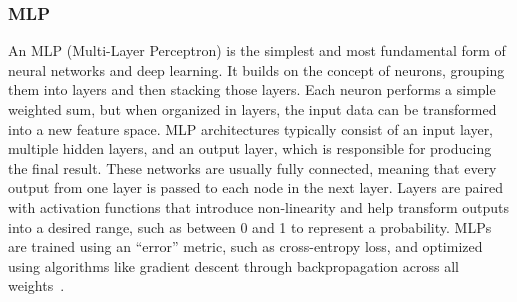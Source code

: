 \subsubsection{MLP}
An MLP (Multi-Layer Perceptron) is the simplest and most fundamental form of neural networks and deep learning. It builds on the concept of neurons, grouping them into layers and then stacking those layers. Each neuron performs a simple weighted sum, but when organized in layers, the input data can be transformed into a new feature space. MLP architectures typically consist of an input layer, multiple hidden layers, and an output layer, which is responsible for producing the final result. These networks are usually fully connected, meaning that every output from one layer is passed to each node in the next layer. Layers are paired with activation functions that introduce non-linearity and help transform outputs into a desired range, such as between 0 and 1 to represent a probability. MLPs are trained using an ``error'' metric, such as cross-entropy loss, and optimized using algorithms like gradient descent through backpropagation across all weights~\cite{mlp_gfg}.
